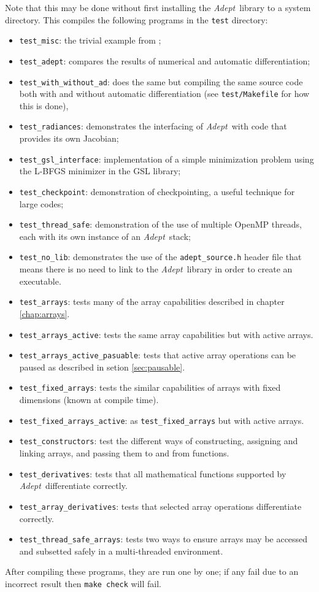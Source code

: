 \documentclass[a4,oneside]{book}
\def\codesize{\small}
\def\Adept{\emph{Adept}}
\def\code#1{{\codesize\texttt{#1}}}
\begin{document}
\begin{enumerate}
Note that this may be done without first installing the
\Adept\ library to a system directory.  This compiles the following
programs in the \code{test} directory:
\begin{itemize}
\item\code{test\_misc}: the trivial example from \cite{Hogan2014};
\item\code{test\_adept}: compares the results of numerical and
  automatic differentiation;
\item\code{test\_with\_without\_ad}: does the same but compiling the
  same source code both with and without automatic differentiation
  (see \code{test/Makefile} for how this is done),
\item\code{test\_radiances}: demonstrates the interfacing of
  \Adept\ with code that provides its own Jacobian;
\item\code{test\_gsl\_interface}: implementation of a simple minimization
  problem using the L-BFGS minimizer in the GSL library;
\item\code{test\_checkpoint}: demonstration of checkpointing, a useful
  technique for large codes;
\item\code{test\_thread\_safe}: demonstration of the use of multiple
  OpenMP threads, each with its own instance of an \Adept\ stack;
\item\code{test\_no\_lib}: demonstrates the use of the
  \code{adept\_source.h} header file that means there is no need to
  link to the \Adept\ library in order to create an executable.
\item\code{test\_arrays}: tests many of the array capabilities
  described in chapter \ref{chap:arrays}.
\item\code{test\_arrays\_active}: tests the same array capabilities
  but with active arrays.
\item\code{test\_arrays\_active\_pasuable}: tests that active array
  operations can be paused as described in setion \ref{sec:pausable}.
\item\code{test\_fixed\_arrays}: tests the similar capabilities of
  arrays with fixed dimensions (known at compile time).
\item\code{test\_fixed\_arrays\_active}: as \code{test\_fixed\_arrays}
  but with active arrays.
\item\code{test\_constructors}: test the different ways of
  constructing, assigning and linking arrays, and passing them to and
  from functions.
\item\code{test\_derivatives}: tests that all mathematical functions
  supported by \Adept\ differentiate correctly.
\item\code{test\_array\_derivatives}: tests that selected array
  operations differentiate correctly.
\item\code{test\_thread\_safe\_arrays}: tests two ways to ensure
  arrays may be accessed and subsetted safely in a multi-threaded
  environment.
\end{itemize}
After compiling these programs, they are run one by one; if any fail
due to an incorrect result then \code{make check} will fail.


\end{enumerate}
\end{document}
